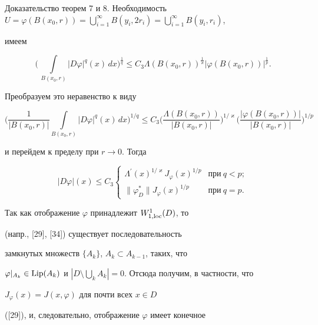 \begin{pf*}{Доказательство теорем 7 и 8. Необходимость}
$U=\varphi(B(x_0,r))=\bigcup\limits_{i=1}^{\infty}B(y_i,2r_i)=


\bigcup\limits_{i=1}^{\infty}B(y_i,r_i)$,


имеем


$$


\bigg(\, \int\limits_{B(x_0,r)}|D\varphi|^q(x)\,dx


\bigg)^{\frac{1}{q}} \leq C_3 \Lambda(B(x_0,r))^{\frac{1}{\varkappa}}


|\varphi(B(x_0,r))|^{\frac{1}{p}}.


$$


Преобразуем это неравенство к виду


$$


\bigg(\frac{1}{|B(x_0,r)|}\int\limits_{B(x_0,r)}|D\varphi|^q(x)\,dx


\bigg)^{1/q}\leq


C_3\bigg({\frac{\Lambda(B(x_0,r))}{|B(x_0,r)|}}\bigg)^{1/\varkappa}


\bigg({\frac{|\varphi(B(x_0,r))|}{|B(x_0,r)|}}\bigg)^{1/p}


$$


и перейдем к пределу при $r\to 0$. Тогда


$$


|D\varphi|(x)\leq C_3


\begin{cases}


\Lambda^{\prime}(x)^{1/\varkappa}


J_{\varphi}(x)^{1/p} & \text{при}\ q<p;\\


\|\varphi^*_D\| J_{\varphi}(x)^{1/p} & \text{при}\ q=p.


\end{cases}


$$





Так как отображение $\varphi$ принадлежит $W^1_{1,\operatorname{loc}}(D)$, то


(напр., [29], [34]) существует последовательность


замкнутых множеств $\{A_k\}$, $A_k\subset A_{k-1}$, таких, что


$\varphi|_{A_k}\in\Lip (A_k)$ и $|D\setminus \bigcup\limits_k


A_k|=0$. Отсюда получим, в частности, что


$J_{\varphi}(x)=J(x,\varphi)$ для почти всех $x\in D$


([29]), и, следовательно, отображение $\varphi$ имеет конечное



\end{pf*}
